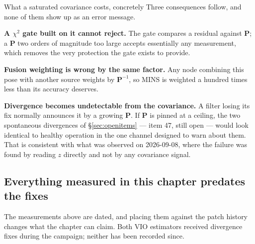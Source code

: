 \begin{trapbox}{What a saturated covariance costs, concretely}
Three consequences follow, and none of them show up as an error message.

\textbf{A $\chi^2$ gate built on it cannot reject.} The gate compares a
residual against $\mathbf{P}$; a $\mathbf{P}$ two orders of magnitude too
large accepts essentially any measurement, which removes the very protection
the gate exists to provide.

\textbf{Fusion weighting is wrong by the same factor.} Any node combining
this pose with another source weights by $\mathbf{P}^{-1}$, so MINS is
weighted a hundred times less than its accuracy deserves.

\textbf{Divergence becomes undetectable from the covariance.} A filter
losing its fix normally announces it by a growing $\mathbf{P}$. If
$\mathbf{P}$ is pinned at a ceiling, the two spontaneous divergences of
\S\ref{sec:openitems} --- item 47, still open --- would look identical to
healthy operation in the one channel designed to warn about them. That is
consistent with what was observed on 2026-09-08, where the failure was
found by reading $z$ directly and not by any covariance signal.
\end{trapbox}

\subsection{Everything measured in this chapter predates the fixes}
\label{sec:datationpreuves}

The measurements above are dated, and placing them against the patch
history changes what the chapter can claim. Both VIO estimators received
divergence fixes during the campaign; neither has been recorded since.

